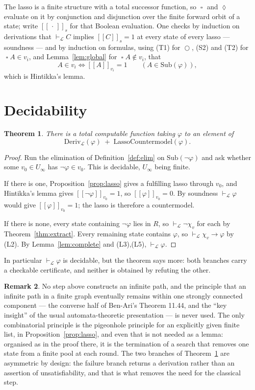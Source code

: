 \documentclass[11pt,a4paper]{article}
\newtheorem{theorem}{Theorem}[section]
\theoremstyle{definition}
\newtheorem{remark}[theorem]{Remark}
\newcommand{\Next}{\mathop{\bigcirc}}
\newcommand{\Always}{\mathop{\square}}
\newcommand{\Event}{\mathop{\lozenge}}
\newcommand{\Sub}{\mathrm{Sub}}
\newcommand{\proves}{\vdash_{\mathcal{L}}}
\begin{document}
The lasso is a finite structure with a total successor function, so $\Always$
and $\Event$ evaluate on it by conjunction and disjunction over the finite
forward orbit of a state; write $[\![\,\cdot\,]\!]_s$ for that Boolean
evaluation.  One checks by induction on derivations that $\proves C$ implies
$[\![C]\!]_s=1$ at every state of every lasso --- soundness --- and by induction
on formulas, using (T1) for $\Next$, (S2) and (T2) for $\Always A\in v_i$, and
Lemma~\ref{lem:global} for $\Always A\notin v_i$, that
\[
  A\in v_i\iff [\![A]\!]_{v_i}=1 \qquad (A\in\Sub(\varphi)),
\]
which is Hintikka's lemma.

\section{Decidability}

\begin{theorem}\label{thm:main}
There is a total computable function taking $\varphi$ to an element of
\[
  \mathrm{Deriv}_{\mathcal{L}}(\varphi)\;+\;\mathrm{LassoCountermodel}(\varphi).
\]
\end{theorem}

\begin{proof}
Run the elimination of Definition~\ref{def:elim} on $\Sub(\neg\varphi)$ and ask
whether some $v_0\in U_\infty$ has $\neg\varphi\in v_0$.  This is decidable,
$U_\infty$ being finite.

If there is one, Proposition~\ref{prop:lasso} gives a fulfilling lasso through
$v_0$, and Hintikka's lemma gives $[\![\neg\varphi]\!]_{v_0}=1$, so
$[\![\varphi]\!]_{v_0}=0$.  By soundness $\proves\varphi$ would give
$[\![\varphi]\!]_{v_0}=1$; the lasso is therefore a countermodel.

If there is none, every state containing $\neg\varphi$ lies in $R$, so
$\proves\neg\chi_v$ for each by Theorem~\ref{thm:extract}.  Every remaining
state contains $\varphi$, so $\proves\chi_v\to\varphi$ by (L2).  By
Lemma~\ref{lem:complete} and (L3),(L5), $\proves\varphi$.
\end{proof}

In particular $\proves\varphi$ is decidable, but the theorem says more: both
branches carry a checkable certificate, and neither is obtained by refuting the
other.

\begin{remark}
No step above constructs an infinite path, and the principle that an infinite
path in a finite graph eventually remains within one strongly connected
component --- the converse half of Ben-Ari's Theorem 11.44, and the ``key
insight'' of the usual automata-theoretic presentation --- is never used.  The
only combinatorial principle is the pigeonhole principle for an explicitly given
finite list, in Proposition~\ref{prop:lasso}, and even that is not needed as a
lemma: organised as in the proof there, it is the termination of a search that
removes one state from a finite pool at each round.  The two branches of
Theorem~\ref{thm:main} are asymmetric by design: the failure branch returns a
derivation rather than an assertion of unsatisfiability, and that is what
removes the need for the classical step.
\end{remark}
\end{document}
